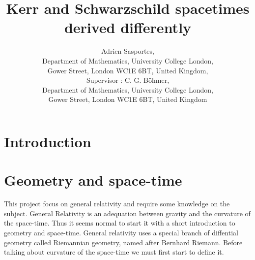 \documentclass[a4paper,12pt]{article}
\title{Kerr and Schwarzschild spacetimes derived differently}
\author{Adrien Sasportes,\\
Department of Mathematics, University College London, \\
Gower Street, London WC1E 6BT, United Kingdom,
\\ Supervisor : C. G. B\"ohmer,\\
Department of Mathematics, University College London, \\
Gower Street, London WC1E 6BT, United Kingdom
}
\theoremstyle{definition}
\begin{document}
\maketitle
{}
\newtheorem{definition}{Definition}

\section{Introduction}

\section{Geometry and space-time}
This project focus on general relativity and require some knowledge on the subject.
General Relativity is an adequation between gravity and the curvature of the space-time.
Thus it seems normal to start it with a short introduction to geometry and space-time.
General relativity uses a special branch of diffential geometry called Riemannian geometry, named after Bernhard Riemann.
Before talking about curvature of the space-time we must first start to define it.
\end{document}
